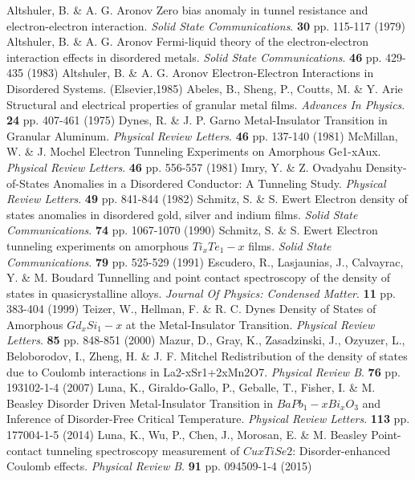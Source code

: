   \begin{thebibliography}{99}
Altshuler, B. \& A. G. Aronov Zero bias anomaly in tunnel resistance and electron-electron interaction. {\em Solid State Communications}. \textbf{30} pp. 115-117 (1979)
Altshuler, B. \& A. G. Aronov Fermi-liquid theory of the electron-electron interaction effects in disordered metals. {\em Solid State Communications}. \textbf{46} pp. 429-435 (1983)
Altshuler, B. \& A. G. Aronov Electron-Electron Interactions in Disordered Systems. (Elsevier,1985)
Abeles, B., Sheng, P., Coutts, M. \& Y. Arie Structural and electrical properties of granular metal films. {\em Advances In Physics}. \textbf{24} pp. 407-461 (1975)
Dynes, R. \& J. P. Garno Metal-Insulator Transition in Granular Aluminum. {\em Physical Review Letters}. \textbf{46} pp. 137-140 (1981)
McMillan, W. \& J. Mochel Electron Tunneling Experiments on Amorphous Ge1-xAux. {\em Physical Review Letters}. \textbf{46} pp. 556-557 (1981)
Imry, Y. \& Z. Ovadyahu Density-of-States Anomalies in a Disordered Conductor: A Tunneling Study. {\em Physical Review Letters}. \textbf{49} pp. 841-844 (1982)
Schmitz, S. \& S. Ewert Electron density of states anomalies in disordered gold, silver and indium films. {\em Solid State Communications}. \textbf{74} pp. 1067-1070 (1990)
Schmitz, S. \& S. Ewert Electron tunneling experiments on amorphous $Ti_xTe_1-x$ films. {\em Solid State Communications}. \textbf{79} pp. 525-529 (1991)
Escudero, R., Lasjaunias, J., Calvayrac, Y. \& M. Boudard Tunnelling and point contact spectroscopy of the density of states in quasicrystalline alloys. {\em Journal Of Physics: Condensed Matter}. \textbf{11} pp. 383-404 (1999)
Teizer, W., Hellman, F. \& R. C. Dynes Density of States of Amorphous $Gd_xSi_1-x$ at the Metal-Insulator Transition. {\em Physical Review Letters}. \textbf{85} pp. 848-851 (2000)
Mazur, D., Gray, K., Zasadzinski, J., Ozyuzer, L., Beloborodov, I., Zheng, H. \& J. F. Mitchel Redistribution of the density of states due to Coulomb interactions in La2-xSr1+2xMn2O7. {\em Physical Review B}. \textbf{76} pp. 193102-1-4 (2007)
Luna, K., Giraldo-Gallo, P., Geballe, T., Fisher, I. \& M. Beasley Disorder Driven Metal-Insulator Transition in $BaPb_1-xBi_xO_3$ and Inference of Disorder-Free Critical Temperature. {\em Physical Review Letters}. \textbf{113} pp. 177004-1-5 (2014)
Luna, K., Wu, P., Chen, J., Morosan, E. \& M. Beasley Point-contact tunneling spectroscopy measurement of $CuxTiSe2$: Disorder-enhanced Coulomb effects. {\em Physical Review B}. \textbf{91} pp. 094509-1-4 (2015)

\end{thebibliography}
